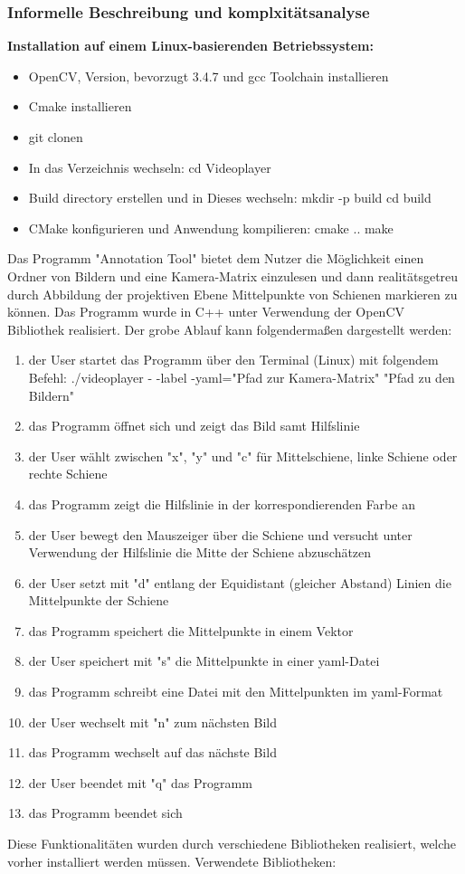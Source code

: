 \documentclass[11pt]{scrartcl}
\begin{document}
\subsubsection{Informelle Beschreibung und komplxitätsanalyse}
\label{Informelle Beschreibung und komplxitätsanalyse}

\textbf{Installation auf einem Linux-basierenden Betriebssystem:} 
\begin{itemize}
	\item OpenCV, Version, bevorzugt 3.4.7 und gcc Toolchain installieren
	\item Cmake installieren
	\item git clonen
	\item In das Verzeichnis wechseln: cd Videoplayer
	\item Build directory erstellen und in Dieses wechseln: mkdir -p build cd build
	\item CMake konfigurieren und Anwendung kompilieren: cmake .. make
\end{itemize}
\noindent
Das Programm "Annotation Tool" bietet dem Nutzer die Möglichkeit einen Ordner von Bildern und eine Kamera-Matrix einzulesen und dann realitätsgetreu durch Abbildung der projektiven Ebene Mittelpunkte von Schienen markieren zu können. Das Programm wurde in C++ unter Verwendung der OpenCV Bibliothek realisiert.  Der grobe Ablauf kann folgendermaßen dargestellt werden:

\begin{enumerate}
	\item der User startet das Programm über den Terminal (Linux) mit folgendem Befehl: ./videoplayer - -label -yaml="Pfad zur Kamera-Matrix" "Pfad zu den Bildern"
	\item das Programm öffnet sich und zeigt das Bild samt Hilfslinie
	\item der User wählt zwischen "x", "y" und "c" für Mittelschiene, linke Schiene oder rechte Schiene
	\item das Programm zeigt die Hilfslinie in der korrespondierenden Farbe an
	\item der User bewegt den Mauszeiger über die Schiene und versucht unter Verwendung der Hilfslinie die Mitte der Schiene abzuschätzen
	\item der User setzt mit "d" entlang der Equidistant (gleicher Abstand) Linien die Mittelpunkte der Schiene
	\item das Programm speichert die Mittelpunkte in einem Vektor
	\item der User speichert mit "s" die Mittelpunkte in einer yaml-Datei
	\item das Programm schreibt eine Datei mit den Mittelpunkten im yaml-Format
	\item der User wechselt mit "n" zum nächsten Bild
	\item das Programm wechselt auf das nächste Bild
	\item der User beendet mit "q" das Programm
	\item das Programm beendet sich
\end{enumerate}
\noindent
Diese Funktionalitäten wurden durch verschiedene Bibliotheken realisiert, welche vorher installiert werden müssen. 
Verwendete Bibliotheken:
\end{document}
